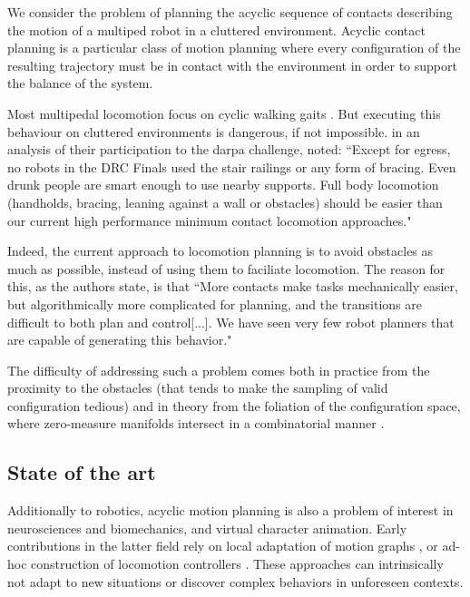 We consider the problem of planning the acyclic sequence of contacts describing the motion of a multiped robot in a cluttered environment. Acyclic contact planning is a particular class of motion planning where every configuration of the resulting trajectory must be in contact with the environment in order to support the balance of the system.

Most multipedal locomotion focus on cyclic walking gaits \citep{Kajita03a}. But executing
this behaviour on cluttered environments is dangerous, if not impossible.
in an analysis of their participation to the darpa challenge, \citeauthor{atkensondarpa}
noted: ``Except for egress, no robots in the DRC Finals used
the  stair  railings  or  any  form  of  bracing.   Even  drunk  people  are  smart  enough  to  use  nearby  supports.
Full body locomotion (handholds,  bracing,  leaning against a wall or obstacles) should be easier than our
current high performance minimum contact locomotion approaches."

Indeed, the current approach to locomotion planning is to avoid obstacles as much as possible, instead of using them
to faciliate locomotion. The reason for this, as the authors state, is that ``More contacts make tasks
mechanically easier, but algorithmically more complicated for planning, and the transitions are difficult to
both plan and control[...].  We have seen very few robot planners that are  capable of  generating this  behavior."

The difficulty of addressing such a problem comes both in practice from the proximity to the obstacles (that tends to make the sampling of valid configuration tedious) and in theory from the foliation of the configuration space, where zero-measure manifolds intersect in a combinatorial manner \citep{simeon-manipulation-04}.

\subsection{State of the art}

\newcommand{\Pa}{$\mathcal{P}_1$ }
\newcommand{\Pb}{$\mathcal{P}_2$ }

Additionally to robotics, acyclic motion planning is also a problem of interest in neurosciences and biomechanics, and virtual character animation.
Early contributions in the latter field rely on local adaptation of motion graphs \citep{citeulike:220163}, or ad-hoc construction of locomotion controllers \citep{Pettre:2003:LPD:846276.846313}. These approaches can intrinsically not adapt to new situations or discover complex behaviors in unforeseen contexts.

